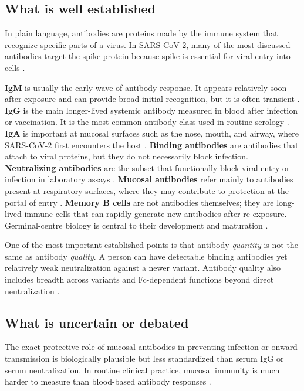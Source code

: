 \documentclass[12pt]{article}
\begin{document}
\subsection*{What is well established}
In plain language, antibodies are proteins made by the immune system that recognize specific parts of a virus. In SARS-CoV-2, many of the most discussed antibodies target the spike protein because spike is essential for viral entry into cells \cite{ref3,ref5}.

\textbf{IgM} is usually the early wave of antibody response. It appears relatively soon after exposure and can provide broad initial recognition, but it is often transient \cite{ref5}.  
\textbf{IgG} is the main longer-lived systemic antibody measured in blood after infection or vaccination. It is the most common antibody class used in routine serology \cite{ref5}.  
\textbf{IgA} is important at mucosal surfaces such as the nose, mouth, and airway, where SARS-CoV-2 first encounters the host \cite{ref3,ref5}.  
\textbf{Binding antibodies} are antibodies that attach to viral proteins, but they do not necessarily block infection.  
\textbf{Neutralizing antibodies} are the subset that functionally block viral entry or infection in laboratory assays \cite{ref3}.  
\textbf{Mucosal antibodies} refer mainly to antibodies present at respiratory surfaces, where they may contribute to protection at the portal of entry \cite{ref5}.  
\textbf{Memory B cells} are not antibodies themselves; they are long-lived immune cells that can rapidly generate new antibodies after re-exposure. Germinal-centre biology is central to their development and maturation \cite{ref4,ref5}.

One of the most important established points is that antibody \emph{quantity} is not the same as antibody \emph{quality}. A person can have detectable binding antibodies yet relatively weak neutralization against a newer variant. Antibody quality also includes breadth across variants and Fc-dependent functions beyond direct neutralization \cite{ref3}.

\subsection*{What is uncertain or debated}
The exact protective role of mucosal antibodies in preventing infection or onward transmission is biologically plausible but less standardized than serum IgG or serum neutralization. In routine clinical practice, mucosal immunity is much harder to measure than blood-based antibody responses \cite{ref5}.
\end{document}
